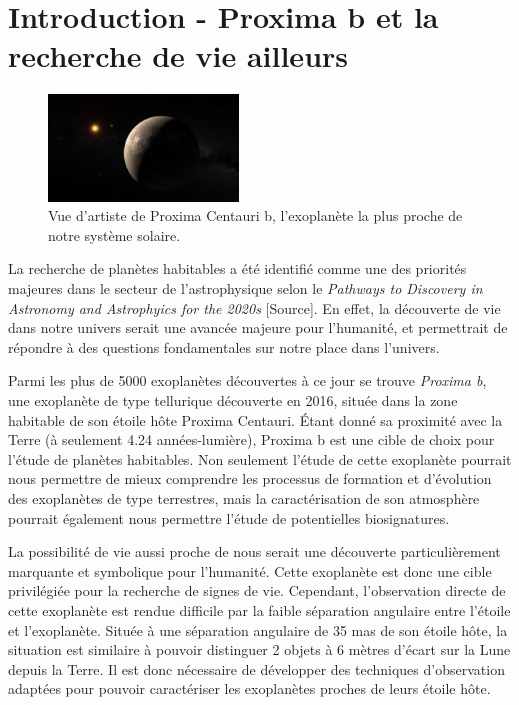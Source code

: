 
\section{\centering Introduction - Proxima b et la recherche de vie ailleurs}
\setlength{\columnsep}{1.3em}%
\begin{figure}
    \includegraphics[width=0.45\textwidth]{figures/art_proxb.jpg}
    \caption{Vue d'artiste de Proxima Centauri b, l'exoplanète la plus proche de notre système solaire.}
\end{figure}

La recherche de planètes habitables a été identifié comme une des priorités majeures dans le secteur de l'astrophysique selon le \textsl{Pathways to Discovery in Astronomy and Astrophyics for the 2020s} [Source]. En effet, la découverte de vie dans notre univers serait une avancée majeure pour l'humanité, et permettrait de répondre à des questions fondamentales sur notre place dans l'univers. 

Parmi les plus de 5000 exoplanètes découvertes à ce jour se trouve \textsl{Proxima b}, une exoplanète de type tellurique découverte en 2016, située dans la zone habitable de son étoile hôte Proxima Centauri. Étant donné sa proximité avec la Terre (à seulement 4.24 années-lumière), Proxima b est une cible de choix pour l'étude de planètes habitables. Non seulement l'étude de cette exoplanète pourrait nous permettre de mieux comprendre les processus de formation et d'évolution des exoplanètes de type terrestres, mais la caractérisation de son atmosphère pourrait également nous permettre l'étude de potentielles biosignatures.

La possibilité de vie aussi proche de nous serait une découverte particulièrement marquante et symbolique pour l'humanité. Cette exoplanète est donc une cible privilégiée pour la recherche de signes de vie. Cependant, l'observation directe de cette exoplanète est rendue difficile par la faible séparation angulaire entre l'étoile et l'exoplanète. Située à une séparation angulaire de 35 mas de son étoile hôte, la situation est similaire à pouvoir distinguer 2 objets à 6 mètres d'écart sur la Lune depuis la Terre. Il est donc nécessaire de développer des techniques d'observation adaptées pour pouvoir caractériser les exoplanètes proches de leurs étoile hôte.

